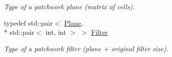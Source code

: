 \begin{DoxyCompactItemize}
\begin{DoxyCompactList}\small\item\em Type of a patchwork plane (matrix of cells). \end{DoxyCompactList}\item 
\hypertarget{class_f_f_l_d_1_1_patchwork_aa342f3a41430505b16a53c3e2683c497}{typedef std\-::pair$<$ \hyperlink{class_f_f_l_d_1_1_patchwork_a119551af7ed0303c3d6a0396ff4d3d39}{Plane}, \\*
std\-::pair$<$ int, int $>$ $>$ \hyperlink{class_f_f_l_d_1_1_patchwork_aa342f3a41430505b16a53c3e2683c497}{Filter}}\label{class_f_f_l_d_1_1_patchwork_aa342f3a41430505b16a53c3e2683c497}

\begin{DoxyCompactList}\small\item\em Type of a patchwork filter (plane + original filter size). \end{DoxyCompactList}\end{DoxyCompactItemize}
